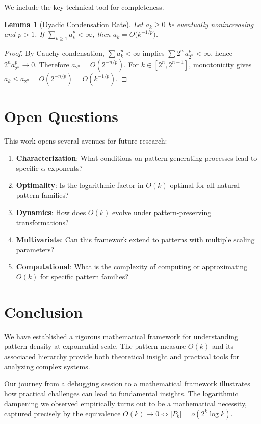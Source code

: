 \documentclass[11pt]{article}
\newtheorem{lemma}[theorem]{Lemma}
\theoremstyle{definition}
\begin{document}
We include the key technical tool for completeness.

\begin{lemma}[Dyadic Condensation Rate]\label{lem:dyadic}
Let $a_k\ge 0$ be eventually nonincreasing and $p>1$. If $\sum_{k\ge 1} a_k^{p}<\infty$, then $a_k=O\big(k^{-1/p}\big)$.
\end{lemma}

\begin{proof}
By Cauchy condensation, $\sum a_k^p<\infty$ implies $\sum 2^n\,a_{2^n}^p<\infty$, hence $2^n a_{2^n}^p\to 0$. Therefore $a_{2^n}=O(2^{-n/p})$. For $k\in[2^n,2^{n+1}]$, monotonicity gives $a_k\le a_{2^n}=O(2^{-n/p})=O(k^{-1/p})$.
\end{proof}

\section{Open Questions}

This work opens several avenues for future research:

\begin{enumerate}
\item \textbf{Characterization}: What conditions on pattern-generating processes lead to specific $\alpha$-exponents?
\item \textbf{Optimality}: Is the logarithmic factor in $O(k)$ optimal for all natural pattern families?
\item \textbf{Dynamics}: How does $O(k)$ evolve under pattern-preserving transformations?
\item \textbf{Multivariate}: Can this framework extend to patterns with multiple scaling parameters?
\item \textbf{Computational}: What is the complexity of computing or approximating $O(k)$ for specific pattern families?
\end{enumerate}

\section{Conclusion}

We have established a rigorous mathematical framework for understanding pattern density at exponential scale. The pattern measure $O(k)$ and its associated hierarchy provide both theoretical insight and practical tools for analyzing complex systems.

Our journey from a debugging session to a mathematical framework illustrates how practical challenges can lead to fundamental insights. The logarithmic dampening we observed empirically turns out to be a mathematical necessity, captured precisely by the equivalence $O(k)\to 0\iff |P_k|=o(2^k\log k)$.
\end{document}
